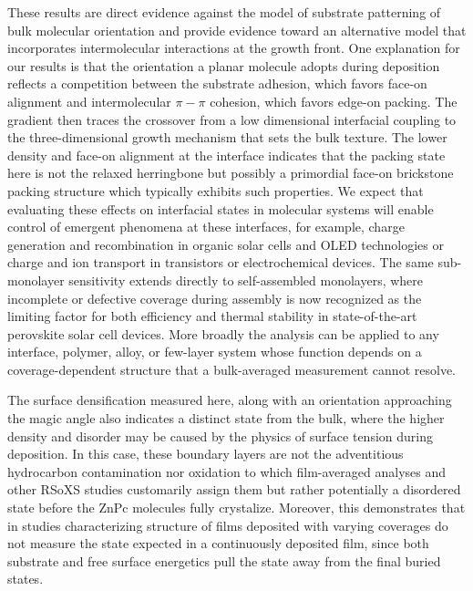 These results are direct evidence against the model of substrate patterning of bulk molecular orientation and provide evidence toward an alternative model that incorporates intermolecular interactions at the growth front. One explanation for our results is that the orientation a planar molecule adopts during deposition reflects a competition between the substrate adhesion, which favors face-on alignment and intermolecular \(\pi - \pi\) cohesion, which favors edge-on packing. The gradient then traces the crossover from a low dimensional interfacial coupling to the three-dimensional growth mechanism that sets the bulk texture. The lower density and face-on alignment at the interface indicates that the packing state here is not the relaxed herringbone but possibly a primordial face-on brickstone packing structure which typically exhibits such properties.\autocite{derrienInterfacialRearrangementsStrain2022} We expect that evaluating these effects on interfacial states in molecular systems will enable control of emergent phenomena at these interfaces, for example, charge generation and recombination in organic solar cells and OLED technologies\autocite{tumblestonInfluenceMolecularOrientation2014,yokoyamaMolecularOrientationSmallmolecule2011} or charge and ion transport in transistors\autocite{peiSemiconductorDielectricInterface2020} or electrochemical devices.\autocite{khanLocalChemicalEnhancement2025,flaggResonantXrayDiffraction2023,mayerLumenChargeGoverns2026,triggSelfassembledHighlyOrdered2018,dongSuperProtonConductive2010} The same sub-monolayer sensitivity extends directly to self-assembled monolayers, where incomplete or defective coverage during assembly is now recognized as the limiting factor for both efficiency and thermal stability in state-of-the-art perovskite solar cell devices.\autocite{jiangToughenedSelfassembledMonolayers2025} More broadly the analysis can be applied to any interface, polymer, alloy, or few-layer system whose function depends on a coverage-dependent structure that a bulk-averaged measurement cannot resolve.

The surface densification measured here, along with an orientation approaching the magic angle also indicates a distinct state from the bulk, where the higher density and disorder may be caused by the physics of surface tension during deposition. In this case, these boundary layers are not the adventitious hydrocarbon contamination nor oxidation to which film-averaged analyses and other RSoXS studies customarily assign them\autocite{ferronCompositionDictatesMolecular2023,fostiropoulosTemperatureinducedMoleculeAssembly2019} but rather potentially a disordered state before the ZnPc molecules fully crystalize. Moreover, this demonstrates that in studies characterizing structure of films deposited with varying coverages\autocite{derrienInterfacialRearrangementsStrain2022,yamamotoVariationZincPhthalocyanine2022,deoteyzaStructuralRearrangementsInitial2006} do not measure the state expected in a continuously deposited film, since both substrate and free surface energetics pull the state away from the final buried states.

